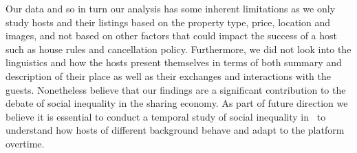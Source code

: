 Our data and so in turn our analysis  has some inherent limitations as we only study  hosts and their listings based on the property  type, price, location and images, and not based on other factors that could impact the success of a host such as  house rules and cancellation policy. Furthermore, we did not look into the linguistics and how the hosts present themselves in terms of both summary and description of their place as well as their  exchanges and interactions with the guests. Nonetheless believe that our findings are a significant contribution to the debate of social inequality in the sharing economy. As part of future direction we believe it is essential to conduct a temporal  study of  social inequality in \ab \ to understand how hosts of different background behave and adapt to the platform overtime. 